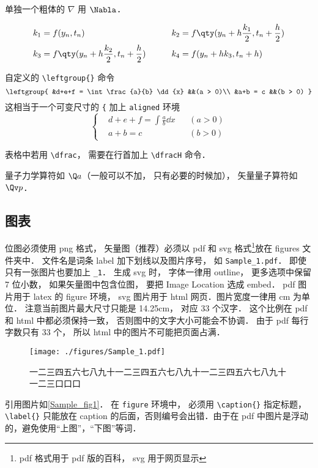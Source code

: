 单独一个粗体的 $\nabla$ 用 $\Nabla$．

\begin{equation}
\begin{aligned}
k_1 &= f(y_n, t_n) 
& k_2 &= f \qty(y_n + h\frac{k_1}{2}, t_n + \frac h2 )\\
k_3 &= f \qty( y_n + h\frac{k_2}{2}, t_n + \frac h2 ) \qquad
& k_4 &= f(y_n + hk_3, t_n + h)
\end{aligned}
\end{equation}

自定义的 \verb|\leftgroup{}| 命令
\begin{equation}
\leftgroup{
&d+e+f = \int \frac{a}{b} \dd{x} &&(a > 0)\\
&a+b = c &&(b > 0)
}
\end{equation}
这相当于一个可变尺寸的 \verb|{| 加上 \verb|aligned| 环境
\begin{equation}
\left\{
\begin{aligned}
&d+e+f = \int \frac{a}{b} \dd{x} &&(a > 0)\\
&a+b = c &&(b > 0)
\end{aligned}
\right.
\end{equation}

表格中若用 \verb|\dfrac|， 需要在行首加上 \verb|\dfracH| 命令．%

量子力学算符如 $\Q a$（一般可以不加， 只有必要的时候加）， 矢量量子算符如 $\Qv p$．

\subsection{图表}

位图必须使用 png 格式， 矢量图（推荐）必须以 pdf 和 svg 格式\footnote{pdf 格式用于 pdf 版的百科， svg 用于网页显示}放在 figures 文件夹中． 文件名是词条 label 加下划线以及图片序号， 如 \verb|Sample_1.pdf|． 即使只有一张图片也要加上 \verb|_1|． 生成 svg 时， 字体一律用 outline， 更多选项中保留 7 位小数， 如果矢量图中包含位图， 要把 Image Location 选成 embed． pdf 图片用于 latex 的 figure 环境， svg 图片用于 html 网页．图片宽度一律用 cm 为单位． 注意当前图片最大尺寸只能是 14.25cm， 对应 33 个汉字． 这个比例在 pdf 和 html 中都必须保持一致， 否则图中的文字大小可能会不协调． 由于 pdf 每行字数只有 33 个， 所以 html 中的图片不可能把页面占满．
\begin{figure}[ht]
\centering
\texttt{[image: ./figures/Sample\_1.pdf]}
\caption{一二三四五六七八九十一二三四五六七八九十一二三四五六七八九十一二三口口口} \label{Sample_fig1}
\end{figure}
引用图片如\autoref{Sample_fig1}． 在 \verb|figure| 环境中， 必须用 \verb|\caption{}| 指定标题， \verb|\label{}| 只能放在 caption 的后面，否则编号会出错．由于在 pdf 中图片是浮动的，避免使用“上图”，“下图”等词．

